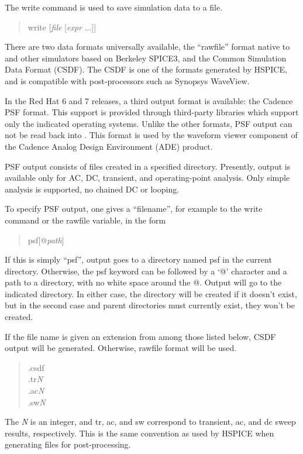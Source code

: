 
The {\cb write} command is used to save simulation data to a file.
\begin{quote}\vt
write [{\it file} [{\it expr} ...]]
\end{quote}
There are two data formats universally available, the ``rawfile''
format native to {\WRspice} and other simulators based on Berkeley
SPICE3, and the Common Simulation Data Format (CSDF).  The CSDF is one
of the formats generated by HSPICE, and is compatible with
post-processors such as Synopsys WaveView.

In the Red Hat 6 and 7 releases, a third output format is available: 
the Cadence PSF format.  This support is provided through third-party
libraries which support only the indicated operating systems.  Unlike
the other formats, PSF output can not be read back into {\WRspice}. 
This format is used by the waveform viewer component of the Cadence
Analog Design Environment (ADE) product.

PSF output consists of files created in a specified directory. 
Presently, output is available only for AC, DC, transient, and
operating-point analysis.  Only simple analysis is supported, no
chained DC or looping.

To specify PSF output, one gives a ``filename'', for example to the
{\cb write} command or the {\vt rawfile} variable, in the form

\begin{quote}
{\vt psf}[{\vt @}{\it path\/}]
\end{quote}

If this is simply ``{\vt psf}'', output goes to a directory named {\vt
psf} in the current directory.  Otherwise, the {\vt psf} keyword can
be followed by a `{\vt @}' character and a path to a directory, with
no white space around the {\vt @}.  Output will go to the indicated
directory.  In either case, the directory will be created if it
doesn't exist, but in the second case and parent directories must
currently exist, they won't be created.

If the file name is given an extension from among those listed
below, CSDF output will be generated.  Otherwise, rawfile format
will be used.
\begin{quote}
{\vt .csdf}\\
{\vt .tr}{\it N}\\
{\vt .ac}{\it N}\\
{\vt .sw}{\it N}
\end{quote}
The {\it N} is an integer, and {\vt tr}, {\vt ac}, and {\vt sw}
correspond to transient, ac, and dc sweep results, respectively.  This
is the same convention as used by HSPICE when generating files for
post-processing.
 
